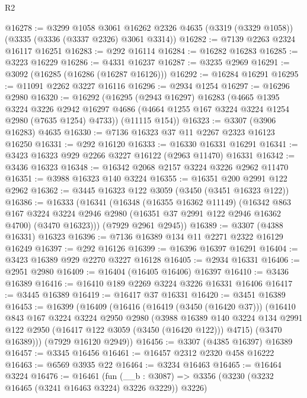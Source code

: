 \begin{lexlean}{R2}
\begin{coremodule}
@16278 := @3299
    @1058
    @3061
    @16262
    @2326
    @4635
    (@3319 (@3329 @1058))
    (@3335 (@3336 (@3337 @2326) @3061 @3314))
@16282 := @7139 @2263 @2324 @16117 @16251
@16283 := @292 @16114
@16284 := @16282 @16283
@16285 := @3223 @16229
@16286 := @4331 @16237
@16287 := @3235 @2969
@16291 := @3092 (@16285 (@16286 (@16287 @16126)))
@16292 := @16284 @16291
@16295 := @11091 @2262 @3227 @16116
@16296 := @2934 @1254
@16297 := @16296 @2980
@16320 := @16292
    (@16295
      (@2943 @16297)
      @16283
      (@4665
        @1395
        @3224
        @3226
        @2942
        @16297
        @4686
        (@4664 @1255 @167 @3224 @3224 @1254 @2980 (@7635 @1254) @4733))
      (@11115 @154))
@16323 := @3307 (@3906 @16283) @4635
@16330 := @7136 @16323 @37 @11 @2267 @2323 @16123 @16250
@16331 := @292 @16120
@16333 := @16330 @16331 @16291
@16341 := @3423 @16323 @929 @2266 @3227 @16122 (@2963 @11470) @16331
@16342 := @3436 @16323
@16348 := @16342 @2068 @2157 @3224 @3226 @2962 @11470
@16351 := @3988 @16323 @140 @3224
@16355 := @16351 @200 @2991 @122 @2962
@16362 := @3445 @16323 @122 @3059 (@3450 (@3451 @16323 @122))
@16386 := @16333
    (@16341
      (@16348
        (@16355 @16362 @11149)
        (@16342
          @863
          @167
          @3224
          @3224
          @2946
          @2980
          (@16351 @37 @2991 @122 @2946 @16362 @4700)
          (@3470 @16323)))
      (@7929 @2961 @2945))
@16389 := @3307 (@4388 @16331) @16323
@16396 := @7136 @16389 @134 @11 @2271 @2322 @16129 @16249
@16397 := @292 @16126
@16399 := @16396 @16397 @16291
@16404 := @3423 @16389 @929 @2270 @3227 @16128
@16405 := @2934 @16331
@16406 := @2951 @2980
@16409 := @16404 (@16405 @16406) @16397
@16410 := @3436 @16389
@16416 := @16410 @189 @2269 @3224 @3226 @16331 @16406
@16417 := @3445 @16389
@16419 := @16417 @37 @16331
@16420 := @3451 @16389
@16453 := @16399
    (@16409
      (@16416
        (@16419 (@3450 (@16420 @37)))
        (@16410
          @843
          @167
          @3224
          @3224
          @2950
          @2980
          (@3988
            @16389
            @140
            @3224
            @134
            @2991
            @122
            @2950
            (@16417 @122 @3059 (@3450 (@16420 @122)))
            @4715)
          (@3470 @16389)))
      (@7929 @16120 @2949))
@16456 := @3307 (@4385 @16397) @16389
@16457 := @3345 @16456
@16461 := @16457 @2312 @2320 @458 @16222
@16463 := @6569 @3935 @22
@16464 := @3234 @16463
@16465 := @16464 @3224
@16476 := @16461
    (fun (__b : @3087) => @3356 (@3230 (@3232 @16465 (@3241 @16463 @3224) @3226 @3229)) @3226)

\end{coremodule}
\end{lexlean}
